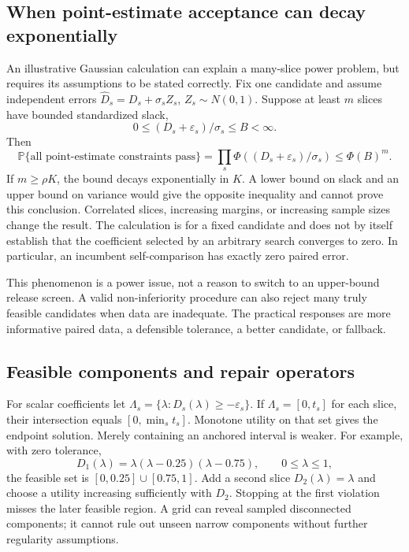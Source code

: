 \documentclass[11pt,letterpaper]{article}
\newcommand{\Prb}{\mathbb{P}}
\newcommand{\eps}{\varepsilon}
\begin{document}
\subsection{When point-estimate acceptance can decay exponentially}
An illustrative Gaussian calculation can explain a many-slice power problem, but requires its assumptions to be stated correctly. Fix one candidate and assume independent errors
$\widehat D_s=D_s+\sigma_s Z_s$, $Z_s\sim N(0,1)$. Suppose at least $m$ slices have bounded standardized slack,
\begin{equation}
0\leq(D_s+\eps_s)/\sigma_s\leq B<\infty.
\end{equation}
Then
\begin{equation}
\Prb\{\text{all point-estimate constraints pass}\}
=\prod_s\Phi((D_s+\eps_s)/\sigma_s)\leq\Phi(B)^m.
\end{equation}
If $m\geq\rho K$, the bound decays exponentially in $K$. A lower bound on slack and an upper bound on variance would give the opposite inequality and cannot prove this conclusion. Correlated slices, increasing margins, or increasing sample sizes change the result. The calculation is for a fixed candidate and does not by itself establish that the coefficient selected by an arbitrary search converges to zero. In particular, an incumbent self-comparison has exactly zero paired error.

This phenomenon is a power issue, not a reason to switch to an upper-bound release screen. A valid non-inferiority procedure can also reject many truly feasible candidates when data are inadequate. The practical responses are more informative paired data, a defensible tolerance, a better candidate, or fallback.

\subsection{Feasible components and repair operators}
For scalar coefficients let $\Lambda_s=\{\lambda:D_s(\lambda)\geq-\eps_s\}$. If $\Lambda_s=[0,t_s]$ for each slice, their intersection equals $[0,\min_s t_s]$. Monotone utility on that set gives the endpoint solution. Merely containing an anchored interval is weaker. For example, with zero tolerance,
\begin{equation}
D_1(\lambda)=\lambda(\lambda-0.25)(\lambda-0.75),\qquad0\leq\lambda\leq1,
\end{equation}
the feasible set is $[0,0.25]\cup[0.75,1]$. Add a second slice $D_2(\lambda)=\lambda$ and choose a utility increasing sufficiently with $D_2$. Stopping at the first violation misses the later feasible region. A grid can reveal sampled disconnected components; it cannot rule out unseen narrow components without further regularity assumptions.
\end{document}
